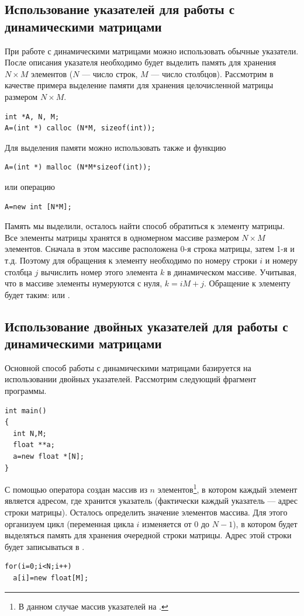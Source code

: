 \subsection[Использование указателей для работы с динамическими матрицами]{Использование указателей для работы с
динамическими матрицами}
При работе с динамическими матрицами можно использовать обычные указатели. После описания указателя необходимо будет
выделить память для хранения $N\times M$ элементов ($N$ --- число строк, $M$ --- число столбцов). Рассмотрим
в качестве примера выделение памяти для хранения целочисленной матрицы размером $N\times M$.
\begin{lstlisting}
int *A, N, M;
A=(int *) calloc (N*M, sizeof(int));
\end{lstlisting}
Для выделения памяти можно использовать также и функцию  
\begin{lstlisting}
A=(int *) malloc (N*M*sizeof(int));
\end{lstlisting}
или операцию 
\begin{lstlisting}
A=new int [N*M];
\end{lstlisting}

Память мы выделили, осталось найти способ обратиться к элементу матрицы. Все элементы матрицы хранятся в одномерном
массиве размером $N\times M$ элементов. Сначала в этом массиве расположена 0-я строка матрицы, затем 1-я и т.д.
Поэтому для обращения к элементу  необходимо по номеру строки $i$ и номеру столбца $j$ вычислить номер этого
элемента $k$ в динамическом массиве. Учитывая, что в массиве элементы нумеруются с нуля,
$k=iM+j$. Обращение к элементу 
будет таким:  или .

\subsection[Использование двойных указателей для работы с динамическими матрицами]{Использование двойных указателей
для работы с динамическими матрицами}
Основной способ работы с динамическими матрицами базируется на использовании двойных указателей. Рассмотрим следующий
фрагмент программы.
\begin{lstlisting}
int main()
{
  int N,M; 
  float **a;
  a=new float *[N];
}
\end{lstlisting}

С помощью оператора  создан массив из $n$ элементов\footnote{В данном случае массив указателей 
на .}, в котором
каждый элемент является адресом, где хранится указатель (фактически каждый указатель --- адрес строки матрицы). Осталось
определить значение элементов массива. Для этого организуем цикл (переменная цикла $i$ изменяется от 0 до
$N-1$), в котором будет выделяться память для хранения очередной строки матрицы. Адрес этой строки будет
записываться в .
\begin{lstlisting}
for(i=0;i<N;i++)
  a[i]=new float[M];
\end{lstlisting}

